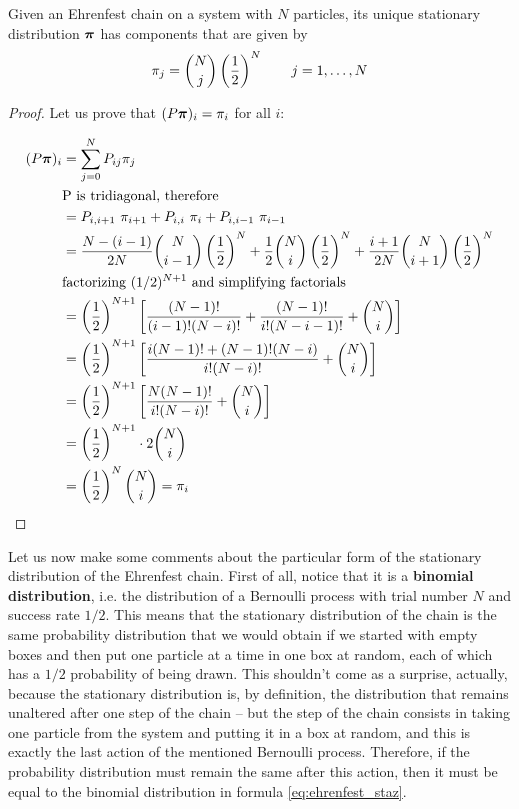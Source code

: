 \begin{theorem}
    Given an Ehrenfest chain on a system with $N$ particles, its unique stationary distribution $\boldsymbol{\pi}$ has components that are given by
    \begin{equation} \label{eq:ehrenfest_staz}
        \pi_j = {{N} \choose {j}} \left(\frac{1}{2} \right)^{N} \quad \quad j = 1,\dots, N
    \end{equation}
\end{theorem}
\begin{proof}
    Let us prove that $(P \boldsymbol{\pi})_i =\pi_i$ for all $i$:

        \begin{align}
            (P \boldsymbol{\pi})_i 
            & =  \sum_{j = 0}^N P_{ij} \pi_j \\
            & \text{P is tridiagonal, therefore} \\ 
            & = P_{i,i+1}~\pi_{i+1} + P_{i,i}~\pi_i + P_{i,i-1}~\pi_{i-1}\\
            & = \frac{N-(i-1)}{2N} {{N} \choose {i-1}} \left(\frac{1}{2} \right)^{N} + \frac{1}{2} {{N} \choose {i}} \left(\frac{1}{2} \right)^{N} + \frac{i+1}{2N} {{N} \choose {i+1}} \left(\frac{1}{2} \right)^{N} \\
            & \text{factorizing $(1/2)^{N+1}$ and simplifying factorials} \\
            & = \left(\frac{1}{2} \right)^{N+1} \left[ \frac{(N-1)!}{(i-1)! (N-i)!} + \frac{(N-1)!}{i! (N-i-1)!} + {{N} \choose {i}} \right]\\
            & = \left(\frac{1}{2} \right)^{N+1} \left[ \frac{i (N-1)! + (N-1)! (N-i)}{i! (N-i)!} + {{N} \choose {i}} \right] \\
            & = \left(\frac{1}{2} \right)^{N+1} \left[ \frac{N (N-1)!}{i! (N-i)!} + {{N} \choose {i}} \right] \\
            & = \left(\frac{1}{2} \right)^{N+1} \cdot 2 {{N} \choose {i}}\\
            & = \left(\frac{1}{2} \right)^{N} {{N} \choose {i}} = \pi_i 
        \end{align}
\end{proof}


Let us now make some comments about the particular form of the stationary distribution of the Ehrenfest chain. First of all, notice that it is a \textbf{binomial distribution}, i.e. the distribution of a Bernoulli process with trial number $N$ and success rate $1/2$. This means that the stationary distribution of the chain is the same probability distribution that we would obtain if we started with empty boxes and then put one particle at a time in one box at random, each of which has a $1/2$ probability of being drawn. This shouldn't come as a surprise, actually, because the stationary distribution is, by definition, the distribution that remains unaltered after one step of the chain -- but the step of the chain consists in taking one particle from the system and putting it in a box at random, and this is exactly the last action of the mentioned Bernoulli process. Therefore, if the probability distribution must remain the same after this action, then it must be equal to the binomial distribution in formula \ref{eq:ehrenfest_staz}.

